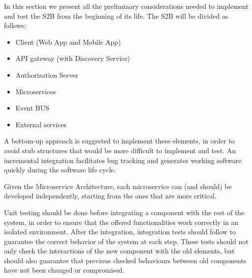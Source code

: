 
In this section we present all the preliminary considerations needed to implement and test the S2B from the beginning of its life.
\newline
\newline
The S2B will be divided as follows:
\begin{itemize}
    \item Client (Web App and Mobile App)
    \item API gateway (with Discovery Service)
    \item Authorization Server
    \item Microservices
    \item Event BUS
    \item External services
\end{itemize}
 
A bottom-up approach is suggested to implement these elements, in order to avoid stub structures that would be more difficult to implement and test. An incremental integration facilitates bug tracking and generates working software quickly during the software life cycle.

Given the Microservice Architecture, each microservice can (and should) be developed independently, starting from the ones that are more critical.
\newline

Unit testing should be done before integrating a component with the rest of the system, in order to ensure that the offered functionalities work correctly in an isolated environment. After the integration, integration tests should follow to guarantee the correct behavior of the system at each step. These tests should not only check the interactions of the new component with the old elements, but should also guarantee that previous checked behaviours between old components have not been changed or compromised.
